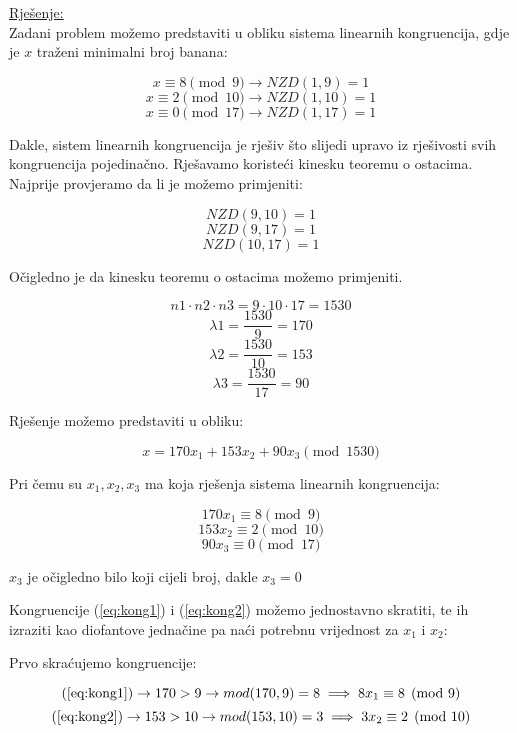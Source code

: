 \documentclass[12pt]{article}
\begin{document}
\underline{Rješenje:}\\

\hspace{0.65cm}Zadani problem možemo predstaviti u obliku sistema linearnih kongruencija, gdje je $x$ traženi minimalni broj banana:

$$x \equiv 8 \pmod{9} \to NZD(1, 9) = 1$$
$$x \equiv 2 \pmod{10} \to NZD(1, 10) = 1$$
$$x \equiv 0 \pmod{17} \to NZD(1, 17) = 1$$\vspace{1mm}

Dakle, sistem linearnih kongruencija je rješiv što slijedi upravo iz rješivosti svih kongruencija pojedinačno. Rješavamo koristeći kinesku teoremu o ostacima. Najprije provjeramo da li je možemo primjeniti: 

$$NZD(9, 10) = 1$$
$$NZD(9, 17) = 1$$
$$NZD(10, 17) = 1$$\vspace{1mm}

Očigledno je da kinesku teoremu o ostacima možemo primjeniti.

$$n1 \cdot n2 \cdot n3 = 9 \cdot 10 \cdot 17 = 1530$$\vspace{1mm}
$$\lambda 1 = \frac{1530}{9} = 170$$\vspace{1mm}
$$\lambda 2 = \frac{1530}{10} = 153$$\vspace{1mm}
$$\lambda 3 = \frac{1530}{17} = 90$$\vspace{1mm}

Rješenje možemo predstaviti u obliku:

$$x = 170x_{1} + 153x_{2} + 90x_{3} \pmod{1530}$$\vspace{1mm}

Pri čemu su $x_{1}, x_{2}, x_{3}$ ma koja rješenja sistema linearnih kongruencija:

\[
170x_{1} \equiv 8 \pmod{9} \label{eq:kong1} \tag{A}
\]
\[
153x_{2} \equiv 2 \pmod{10} \label{eq:kong2} \tag{B}
\]
$$90x_{3} \equiv 0 \pmod{17}$$

\begin{center}
$x_{3}$ je očigledno bilo koji cijeli broj, dakle $x_{3} = 0$
\end{center}\vspace{1mm}

Kongruencije (\ref{eq:kong1}) i (\ref{eq:kong2}) možemo jednostavno skratiti, te ih izraziti kao diofantove jednačine pa naći potrebnu vrijednost za $x_{1}$ i $x_{2}$:

Prvo skraćujemo kongruencije:

$$(\ref{eq:kong1}) \to 170 > 9 \to mod(170, 9) = 8 \implies 8x_{1} \equiv 8 \pmod{9}$$
$$(\ref{eq:kong2}) \to 153 > 10 \to mod(153, 10) = 3 \implies 3x_{2} \equiv 2 \pmod{10}$$\vspace{1mm}
\end{document}
